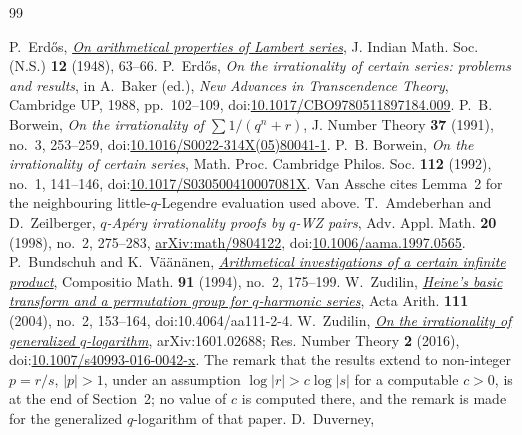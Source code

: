 \documentclass[11pt]{article}
\begin{document}
\begin{thebibliography}{99}
\small
\raggedright
\setlength{\itemsep}{0pt}
 P.~Erd\H{o}s,
  \href{https://users.renyi.hu/~p_erdos/1948-04.pdf}{\emph{On arithmetical
  properties of Lambert series}},
  J. Indian Math. Soc. (N.S.) \textbf{12} (1948), 63--66.
 P.~Erd\H{o}s, \emph{On the irrationality of certain series:
  problems and results}, in A.~Baker (ed.), \emph{New Advances in Transcendence
  Theory}, Cambridge UP, 1988, pp.~102--109,
  doi:\href{https://doi.org/10.1017/CBO9780511897184.009}{10.1017/CBO9780511897184.009}.
 P.~B. Borwein, \emph{On the irrationality of
  $\sum1/(q^{n}+r)$},
  J. Number Theory \textbf{37} (1991), no.~3, 253--259,
  doi:\href{https://doi.org/10.1016/S0022-314X(05)80041-1}{10.1016/S0022-314X(05)80041-1}.
 P.~B. Borwein, \emph{On the irrationality of certain
  series}, Math. Proc. Cambridge Philos. Soc. \textbf{112} (1992), no.~1,
  141--146,
  doi:\href{https://doi.org/10.1017/S030500410007081X}{10.1017/S030500410007081X}.
  Van Assche cites Lemma~2 for the neighbouring little-$q$-Legendre
  evaluation used above.
 T.~Amdeberhan and D.~Zeilberger, \emph{$q$-Ap\'ery
  irrationality proofs by $q$-WZ pairs}, Adv. Appl. Math. \textbf{20} (1998),
  no.~2, 275--283,
  \href{https://arxiv.org/abs/math/9804122}{arXiv:math/9804122},
  doi:\href{https://doi.org/10.1006/aama.1997.0565}{10.1006/aama.1997.0565}.
 P.~Bundschuh and K.~V\"a\"an\"anen,
  \href{https://numdam.org/item/CM_1994__91_2_175_0.pdf}{\emph{Arithmetical
  investigations of a certain infinite product}},
  Compositio Math. \textbf{91} (1994), no.~2, 175--199.
 W.~Zudilin,
  \href{https://geodesic.mathdoc.fr/articles/10.4064/aa111-2-4/}{\emph{Heine's
  basic transform and a permutation group for \(q\)-harmonic series}},
  Acta Arith. \textbf{111} (2004), no.~2, 153--164,
  doi:10.4064/aa111-2-4.
 W.~Zudilin,
  \href{https://arxiv.org/abs/1601.02688}{\emph{On the irrationality of
  generalized \(q\)-logarithm}}, arXiv:1601.02688; Res. Number Theory
  \textbf{2} (2016),
  doi:\href{https://doi.org/10.1007/s40993-016-0042-x}{10.1007/s40993-016-0042-x}.
  The remark that the results extend to non-integer \(p=r/s\), \(|p|>1\), under
  an assumption \(\log|r|>c\log|s|\) for a computable \(c>0\), is at the end of
  Section~2; no value of \(c\) is computed there, and the remark is made for the
  generalized \(q\)-logarithm of that paper.
 D.~Duverney,

\end{thebibliography}
\end{document}
